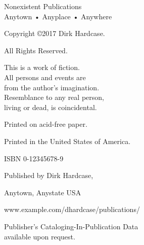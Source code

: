 \documentclass{novel} %
\begin{document}
\frontmatter

\thispagestyle{empty}
\vspace*{6\nbs}
\hfill{}\par
\vspace{\nbs}
\hfill{}\par
\clearpage

\thispagestyle{empty}
\null
\clearpage

\thispagestyle{empty}
\vspace*{5\nbs}
\begin{center}
\par
\vspace{2\nbs}
\par
\vspace{1.5\nbs}
\par
\vspace{4\nbs}
\vspace{4\nbs}
{\theAuthor}
\vfill
{ Nonexistent Publications\\
Anytown • Anyplace • Anywhere}\par

\end{center}
\clearpage


\thispagestyle{empty}
\begin{center}
\itshape{
\null
\vfill
Copyright ©2017 Dirk Hardcase.\par %
All Rights Reserved.\par %
\null
This is a work of fiction.\\
All persons and events are\\
from the author's imagination.\\
Resemblance to any real person,\\
living or dead, is coincidental.\par %
\null
Printed on acid-free paper.\par %
Printed in the United States of America.\par %
\null
ISBN 0-12345678-9\par %
\null

Published by Dirk Hardcase,\par %
Anytown, Anystate USA\par %
www.example.com/dhardcase/publications/\par %
\null
Publisher's Cataloging-In-Publication Data\\
available upon request.\par
} %
\end{center}
\clearpage
\end{document}
